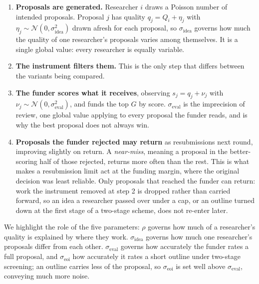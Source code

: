 \documentclass[11pt,a4paper]{article}
\begin{document}
\begin{enumerate}\setlength\itemsep{0.15em}
\item \textbf{Proposals are generated.} Researcher $i$ draws a Poisson number of
      intended proposals. Proposal $j$ has quality $q_j = Q_i + \eta_j$ with
      $\eta_j \sim \mathcal{N}(0, \sigma_{\text{idea}}^2)$ drawn afresh for each
      proposal, so $\sigma_{\text{idea}}$ governs how much the quality of one
      researcher's proposals varies among themselves. It is a single global
      value: every researcher is equally variable.
\item \textbf{The instrument filters them.} This is the only step that differs
      between the variants being compared.
\item \textbf{The funder scores what it receives}, observing
      $s_j = q_j + \nu_j$ with $\nu_j \sim \mathcal{N}(0,\sigma_{\text{eval}}^2)$,
      and funds the top $G$ by score. $\sigma_{\text{eval}}$ is the imprecision
      of review, one global value applying to every proposal the funder reads,
      and is why the best proposal does not always win.
\item \textbf{Proposals the funder rejected may return} as resubmissions next
      round, improving slightly on return. A \emph{near-miss}, meaning a proposal
      in the better-scoring half of those rejected, returns more often than the
      rest. This is what makes a resubmission limit act at the funding margin,
      where the original decision was least reliable. Only proposals that reached
      the funder can return: work the instrument removed at step 2 is dropped
      rather than carried forward, so an idea a researcher passed over under a
      cap, or an outline turned down at the first stage of a two-stage scheme,
      does not re-enter later.
\end{enumerate}

We highlight the role of the five parameters: $\rho$ governs how
much of a researcher's quality is explained by where they work.
$\sigma_{\text{idea}}$ governs how much one researcher's proposals differ from
each other. $\sigma_{\text{eval}}$ governs how accurately the funder rates a full
proposal, and $\sigma_{\text{eoi}}$ how accurately it rates a short outline under
two-stage screening; an outline carries less of the proposal, so
$\sigma_{\text{eoi}}$ is set well above $\sigma_{\text{eval}}$, conveying much more noise.
\end{document}
